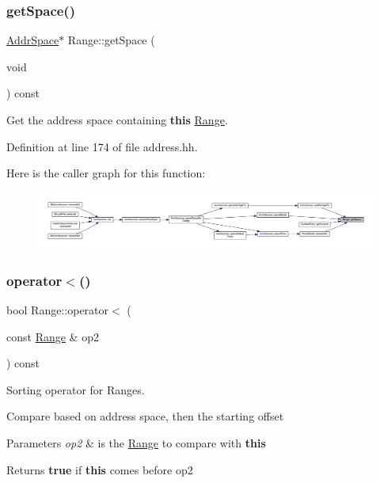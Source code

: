 \subsubsection{\texorpdfstring{getSpace()}{getSpace()}}
{\footnotesize\ttfamily \mbox{\hyperlink{class_addr_space}{Addr\+Space}}$\ast$ Range\+::get\+Space (\begin{DoxyParamCaption}\item[{void}]{ }\end{DoxyParamCaption}) const\hspace{0.3cm}{\ttfamily [inline]}}



Get the address space containing {\bfseries{this}} \mbox{\hyperlink{class_range}{Range}}. 



Definition at line 174 of file address.\+hh.

Here is the caller graph for this function\+:
\nopagebreak
\begin{figure}[H]
\begin{center}
\leavevmode
\includegraphics[width=350pt]{class_range_aca96ab5fbb1da6940d807547a9d9ed30_icgraph}
\end{center}
\end{figure}
\mbox{\label{class_range_af79209e97d5e8df1e26846b478722909}} 
\subsubsection{\texorpdfstring{operator$<$()}{operator<()}}
{\footnotesize\ttfamily bool Range\+::operator$<$ (\begin{DoxyParamCaption}\item[{const \mbox{\hyperlink{class_range}{Range}} \&}]{op2 }\end{DoxyParamCaption}) const\hspace{0.3cm}{\ttfamily [inline]}}



Sorting operator for Ranges. 

Compare based on address space, then the starting offset 
\begin{DoxyParams}{Parameters}
{\em op2} & is the \mbox{\hyperlink{class_range}{Range}} to compare with {\bfseries{this}} \\
\hline
\end{DoxyParams}
\begin{DoxyReturn}{Returns}
{\bfseries{true}} if {\bfseries{this}} comes before op2 
\end{DoxyReturn}


